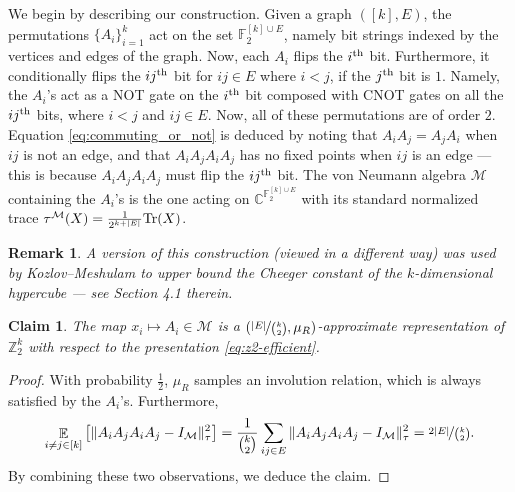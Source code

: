 \documentclass[11pt]{article}
\newtheorem{claim}[theorem]{Claim}
\newtheorem{remark}[theorem]{Remark}
\theoremstyle{definition}
\newcommand{\Tr}{\mbox{\rm Tr}}
\newcommand{\Id}{\ensuremath{I}}
\DeclareMathOperator*{\Expectation}{\mathbb{E}}
\newcommand{\field}{\mathbb{F}_2}
\newcommand{\complex}{\ensuremath{\mathbb{C}}}
\newcommand{\Z}{\ensuremath{\mathbb{Z}}}
\newcommand{\mM}{\ensuremath{\mathcal{M}}}
\newcommand{\cM}{\ensuremath{\mathcal{M}}}
\begin{document}
We begin by describing our construction. Given a graph $([k],E)$, the permutations $\{A_i\}_{i=1}^k$ act on  the set $\field^{[k]\cup E}$, namely bit strings  indexed by the vertices and edges of the graph. Now, each $A_i$ flips the $i^{\rm th}$ bit. Furthermore, it conditionally flips the  $ij^{\rm th}$  bit for $ij\in E$ where $i<j$, if the $j^{\rm th}$ bit is $1$. Namely, the $A_i$'s act as a NOT gate on the $i^{\rm th}$ bit composed with CNOT gates on all the $ij^{\rm th}$ bits, where $i<j$ and $ij\in E$. Now, all of these permutations are of order $2$. Equation \eqref{eq:commuting_or_not} is deduced by noting that  $A_iA_j=A_jA_i$ when $ij$ is not an edge, and that $A_iA_jA_iA_j$ has no fixed points when $ij$ is an edge --- this is because $A_iA_jA_iA_j$ must flip the $ij^{\rm th}$ bit.  
The von Neumann algebra $\mM$ containing the $A_i$'s is the one acting on $\complex^{\field^{[k]\cup E}}$ with its standard normalized trace $\tau^\cM(X)=\frac{1}{2^{k+|E|}}\Tr(X)$.
\begin{remark}
    A version of this construction (viewed in a different way) was used by Kozlov--Meshulam \cite{kozlov2019quantitative} to upper bound the Cheeger constant of the $k$-dimensional hypercube --- see Section 4.1 therein.
\end{remark}
\begin{claim}\label{claim:appendix1}
    The map $x_i\mapsto A_i\in \cM$ is a $(\nicefrac{|E|}{\binom{k}{2}},\mu_R)$-approximate representation of $\Z_2^k$ with respect to the presentation \eqref{eq:z2-efficient}.
\end{claim}

\begin{proof}
    With probability $\frac{1}{2}$, $\mu_R$ samples an involution relation, which is always satisfied by the  $A_i$'s. Furthermore, 
    \[
\Expectation_{i\neq j\in [k]}\left[\Vert A_iA_jA_iA_j-\Id_\mM\Vert_\tau^2\right]=\frac{1}{\binom{k}{2}}\sum_{ij\in E}\Vert A_iA_jA_iA_j-\Id_\mM\Vert_\tau^2=\nicefrac{2|E|}{\binom{k}{2}}.
\]
By combining these two observations, we deduce the claim.
\end{proof}
\end{document}
